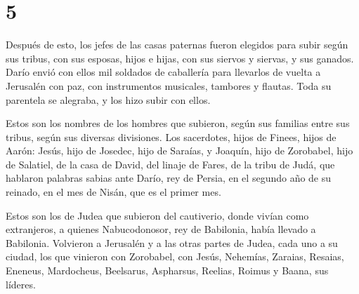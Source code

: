 \hypertarget{section-4}{%
\section{5}\label{section-4}}

 Después de esto, los jefes de las casas paternas fueron
elegidos para subir según sus tribus, con sus esposas, hijos e hijas,
con sus siervos y siervas, y sus ganados.  Darío envió con
ellos mil soldados de caballería para llevarlos de vuelta a Jerusalén
con paz, con instrumentos musicales, tambores y flautas. 
Toda su parentela se alegraba, y los hizo subir con ellos.

 Estos son los nombres de los hombres que subieron, según
sus familias entre sus tribus, según sus diversas divisiones.
 Los sacerdotes, hijos de Finees, hijos de Aarón: Jesús,
hijo de Josedec, hijo de Saraías, y Joaquín, hijo de Zorobabel, hijo de
Salatiel, de la casa de David, del linaje de Fares, de la tribu de Judá,
 que hablaron palabras sabias ante Darío, rey de Persia,
en el segundo año de su reinado, en el mes de Nisán, que es el primer
mes.

 Estos son los de Judea que subieron del cautiverio, donde
vivían como extranjeros, a quienes Nabucodonosor, rey de Babilonia,
había llevado a Babilonia.  Volvieron a Jerusalén y a las
otras partes de Judea, cada uno a su ciudad, los que vinieron con
Zorobabel, con Jesús, Nehemías, Zaraias, Resaias, Eneneus, Mardocheus,
Beelsarus, Aspharsus, Reelias, Roimus y Baana, sus líderes.

